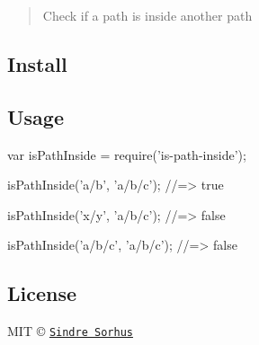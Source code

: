 \begin{quote}
Check if a path is inside another path \end{quote}


\subsection*{Install}




\subsection*{Usage}


\begin{DoxyCode}
var isPathInside = require('is-path-inside');

isPathInside('a/b', 'a/b/c');
//=> true

isPathInside('x/y', 'a/b/c');
//=> false

isPathInside('a/b/c', 'a/b/c');
//=> false
\end{DoxyCode}


\subsection*{License}

M\+IT © \href{http://sindresorhus.com}{\tt Sindre Sorhus} 